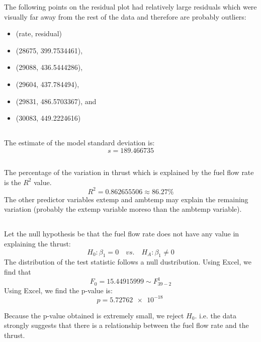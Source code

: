 \documentclass[letterpaper]{article}
\begin{document}
The following points on the residual plot had relatively large residuals which were
visually far away from the rest of the data and therefore are probably outliers:
\begin{itemize}
 \item[] (rate, residual)
 \item[] (28675, 399.7534461),
 \item[] (29088, 436.5444286),
 \item[] (29604, 437.784494),
 \item[] (29831, 486.5703367), and
 \item[] (30083, 449.2224616)
\end{itemize}

\subsection{}
The estimate of the model standard deviation is:
$$s = 189.466735$$

\subsection{}

The percentage of the variation in thrust which is explained by the fuel flow rate
is the $R^2$ value.
$$R^2 = 0.862655506 \approx 86.27\%$$
The other predictor variables extemp and ambtemp may explain the remaining variation
(probably the extemp variable moreso than the ambtemp variable).

\subsection{}

Let the null hypothesis be that the fuel flow rate does not have any value in explaining the thrust:
$$ H_0: \beta_1 =0 \quad vs. \quad H_A: \beta_1 \neq 0 $$
The distribution of the test statistic follows a null dustribution.
Using Excel, we find that
$$F_0 = 15.44915999 \sim F_{39-2}^{1}$$
Using Excel, we find the p-value is:
$$p= \SI{5.72762e-18}{} $$

Because the p-value obtained is extremely small, we reject $H_0$. i.e. the data strongly suggests that there is a relationship between the fuel flow rate and the thrust.
\end{document}
